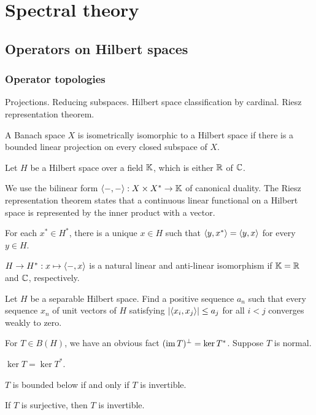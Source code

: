 \documentclass{../../large}
\begin{document}
\part{Spectral theory}

\chapter{Operators on Hilbert spaces}

\section{Operator topologies}
Projections. Reducing subspaces.
Hilbert space classification by cardinal.
Riesz representation theorem.
\begin{prb}
\begin{parts}
\item A Banach space $X$ is isometrically isomorphic to a Hilbert space if there is a bounded linear projection on every closed subspace of $X$.
\end{parts}
\end{prb}

\begin{prb}
Let $H$ be a Hilbert space over a field $\mathbb{K}$, which is either $\mathbb{R}$ of $\mathbb{C}$.


We use the bilinear form $\langle-,-\rangle:X\times X^*\to\mathbb{K}$ of canonical duality.
The Riesz representation theorem states that a continuous linear functional on a Hilbert space is represented by the inner product with a vector.
\begin{parts}
\item For each $x^*\in H^*$, there is a unique $x\in H$ such that $\langle y,x^*\rangle=\langle y,x\rangle$ for every $y\in H$.
\item $H\to H^*:x\mapsto\langle-,x\rangle$ is a natural linear and anti-linear isomorphism if $\mathbb{K}=\mathbb{R}$ and $\mathbb{C}$, respectively.
\end{parts}
\end{prb}



Let $H$ be a separable Hilbert space.
Find a positive sequence $a_n$ such that every sequence $x_n$ of unit vectors of $H$ satisfying $|\langle x_i,x_j\rangle|\le a_j$ for all $i<j$ converges weakly to zero.



\begin{prb}
For $T\in B(H)$, we have an obvious fact $(\operatorname{im} T)^\perp=\ker T^*$.
Suppose $T$ is normal.
\begin{parts}
\item $\ker T=\ker T^*$.
\item $T$ is bounded below if and only if $T$ is invertible.
\item If $T$ is surjective, then $T$ is invertible.
\end{parts}
\end{prb}
\end{document}
